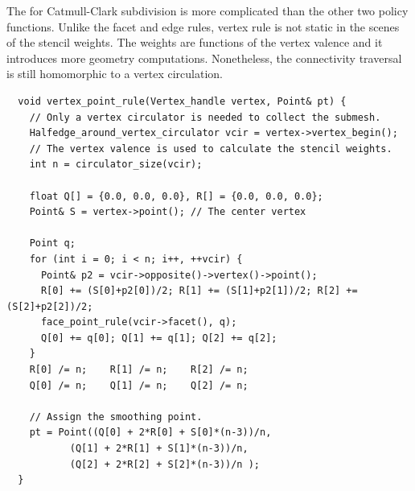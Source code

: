 The  for Catmull-Clark subdivision
is more complicated than the other two policy functions. Unlike
the facet and edge rules, vertex rule is not static in the scenes
of the stencil weights. The weights are functions of the vertex 
valence and it introduces more geometry computations. 
Nonetheless, the connectivity traversal is still homomorphic to
a vertex circulation.  
\begin{lstlisting}
  void vertex_point_rule(Vertex_handle vertex, Point& pt) {
    // Only a vertex circulator is needed to collect the submesh.
    Halfedge_around_vertex_circulator vcir = vertex->vertex_begin();
    // The vertex valence is used to calculate the stencil weights.
    int n = circulator_size(vcir);

    float Q[] = {0.0, 0.0, 0.0}, R[] = {0.0, 0.0, 0.0};
    Point& S = vertex->point(); // The center vertex
    
    Point q;
    for (int i = 0; i < n; i++, ++vcir) {
      Point& p2 = vcir->opposite()->vertex()->point();
      R[0] += (S[0]+p2[0])/2; R[1] += (S[1]+p2[1])/2; R[2] += (S[2]+p2[2])/2;
      face_point_rule(vcir->facet(), q);
      Q[0] += q[0]; Q[1] += q[1]; Q[2] += q[2];
    }
    R[0] /= n;    R[1] /= n;    R[2] /= n;
    Q[0] /= n;    Q[1] /= n;    Q[2] /= n;
      
    // Assign the smoothing point.
    pt = Point((Q[0] + 2*R[0] + S[0]*(n-3))/n,
	       (Q[1] + 2*R[1] + S[1]*(n-3))/n,
	       (Q[2] + 2*R[2] + S[2]*(n-3))/n );
  }
\end{lstlisting}
\vspace{0.5cm}

